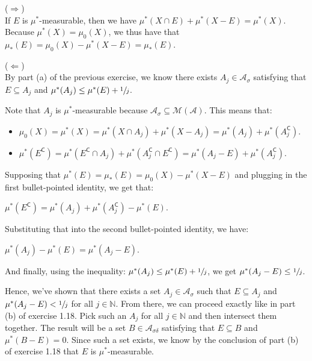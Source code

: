 \documentclass{book}
\newcommand{\exTwoP}{%
   \color{RedViolet}%
   \fontsize{13}{15}\selectfont%
}
\newenvironment{myIndent}{%
   \begin{adjustwidth}{2.5em}{0em}%
}{%
   \end{adjustwidth}%
}
\newcommand{\comp}{\mathsf{C}}
\newcommand{\retTwo}{\hfill\bigbreak}
\begin{document}
\begin{myIndent}\exTwoP
   ($\Longrightarrow$)\\
   If $E$ is $\mu^*$-measurable, then we have $\mu^*(X \cap E) + \mu^*(X - E) = \mu^*(X)$. Because $\mu^*(X) = \mu_0(X)$, we thus have that $\mu_*(E) = \mu_0(X) - \mu^*(X - E) = \mu_*(E)$.\retTwo

   ($\Longleftarrow$)\\
   By part (a) of the previous exercise, we know there exists $A_j \in \mathcal{A}_\sigma$ satisfying that\\ $E \subseteq A_j$ and $\mu^*(A_j) \leq \mu^*(E) + \sfrac{1}{j}$.\retTwo

   Note that $A_j$ is $\mu^*$-measurable because $\mathcal{A}_\sigma \subseteq \mathcal{M}(\mathcal{A})$. This means that:
   \begin{itemize}
      \item $\mu_0(X) = \mu^*(X) = \mu^*(X \cap A_j) + \mu^*(X - A_j) = \mu^*(A_j) + \mu^*(A_j^\comp)$.
      \item $\mu^*(E^\comp) = \mu^*(E^\comp \cap A_j) + \mu^*(A^\comp_j \cap E^\comp) = \mu^*(A_j - E) + \mu^*(A^\comp_j)$.\newpage
   \end{itemize}

   Supposing that $\mu^*(E) = \mu_*(E) = \mu_0(X) - \mu^*(X - E)$ and plugging in the first bullet-pointed identity, we get that:
   
   {\centering $\mu^*(E^\comp) = \mu^*(A_j) + \mu^*(A_j^\comp) - \mu^*(E)$.\retTwo\par}

   Substituting that into the second bullet-pointed identity, we have:

   {\centering $\mu^*(A_j) - \mu^*(E) = \mu^*(A_j - E)$.\retTwo\par}

   And finally, using the inequality: $\mu^*(A_j) \leq \mu^*(E) + \sfrac{1}{j}$, we get $\mu^*(A_j - E) \leq \sfrac{1}{j}$.\retTwo

   Hence, we've shown that there exists a set $A_j \in \mathcal{A}_\sigma$ such that $E \subseteq A_j$ and\\ $\mu^*(A_j - E) < \sfrac{1}{j}$ for all $j \in \mathbb{N}$. From there, we can proceed exactly like in part\\ (b) of exercise 1.18. Pick such an $A_j$ for all $j \in \mathbb{N}$ and then intersect them together. The result will be a set $B \in \mathcal{A}_{\sigma\delta}$ satisfying that $E \subseteq B$ and $\mu^*(B - E) = 0$. Since such a set exists, we know by the conclusion of part (b) of exercise 1.18 that $E$ is $\mu^*$-measurable.
\end{myIndent}
\end{document}
